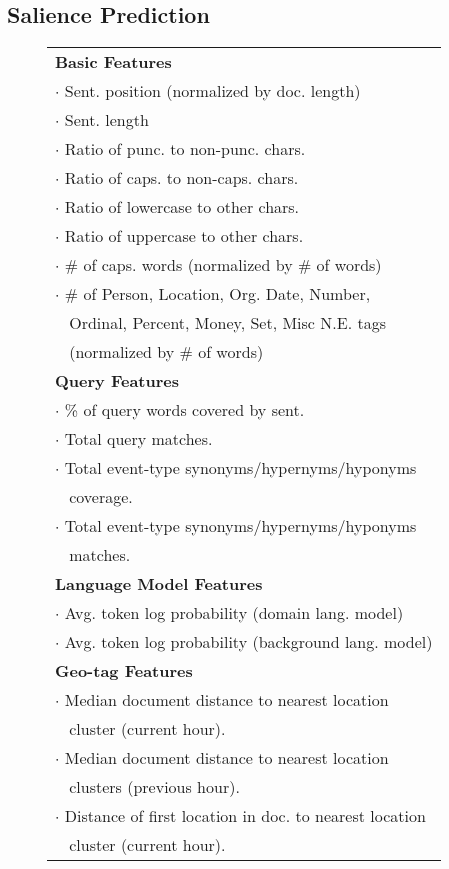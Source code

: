 \subsection{Salience Prediction}
%
\begin{figure}[t!]
\begin{tabular}{| l |} 
\hline
\textbf{Basic Features}\\
$\cdot$ Sent. position (normalized by doc. length) \\
$\cdot$ Sent. length \\
$\cdot$ Ratio of punc. to non-punc. chars. \\
$\cdot$ Ratio of caps. to non-caps. chars. \\
$\cdot$ Ratio of lowercase to other chars. \\
$\cdot$ Ratio of uppercase to other chars. \\
$\cdot$ \# of caps. words (normalized by \# of words)\\
$\cdot$ \# of Person, Location, Org. Date, Number,\\
$\;\;$ Ordinal, Percent, Money, Set, Misc  N.E. tags \\
$\;\;$ (normalized by \# of words)\\
\hline
\textbf{Query Features}\\
$\cdot$ \% of query words covered by sent.\\
$\cdot$ Total query matches.\\
$\cdot$ Total event-type synonyms/hypernyms/hyponyms\\
$\;\;$ coverage.\\
$\cdot$ Total event-type synonyms/hypernyms/hyponyms\\
$\;\;$ matches.\\
\hline
\textbf{Language Model Features}\\
$\cdot$ Avg. token log probability (domain lang. model)\\
$\cdot$ Avg. token log probability (background lang. model)\\
\hline
\textbf{Geo-tag Features}\\
$\cdot$ Median document distance to nearest location \\
$\;\;$ cluster (current hour).\\
$\cdot$ Median document distance to nearest location \\
$\;\;$ clusters (previous hour).\\
$\cdot$ Distance of first location in doc. to nearest location \\
$\;\;$ cluster (current hour).\\

\end{tabular}
\end{figure}

